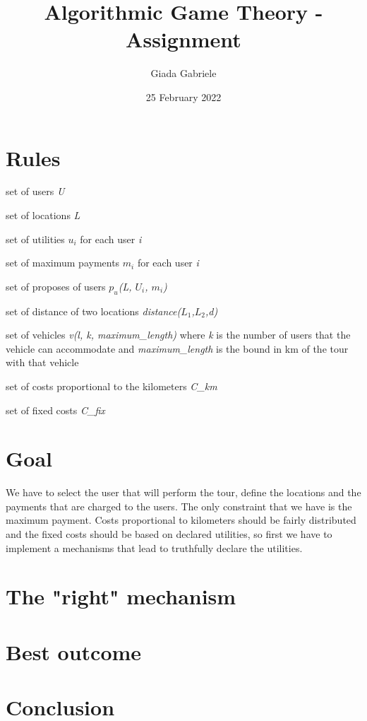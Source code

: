 \documentclass{article}
\title{Algorithmic Game Theory - Assignment}
\author{Giada Gabriele}
\date{25 February 2022}
\begin{document}
\maketitle
\section{Rules}
\begin{itemize}
\Large{
\item set of users \textit{U}
\item set of locations \textit{L}
\item set of utilities \textit{$u_i$} for each user \textit{i}
\item set of maximum payments \textit{$m_i$} for each user \textit{i}
\item set of proposes of users \textit{$p_u$(L, $U_i$, $m_i$)}
\item set of distance of two locations \textit{distance($L_1$,$L_2$,d)}
\item set of vehicles \textit{v(l, k, maximum\_length)} where \textit{k} is the number of users that the vehicle can accommodate and \textit{maximum\_length} is the bound in km of the tour with that vehicle   
}
\item set of costs proportional to the kilometers \textit{C\_km}
\item set of fixed costs \textit{C\_fix}
\end{itemize}
\section{Goal}
\Large{
We have to select the user that will perform the tour, define the locations and the payments that are charged to the users. The only constraint that we have is the maximum payment. Costs proportional to kilometers should be fairly distributed and the fixed costs should be based on declared utilities, so first we have to implement a mechanisms that lead to truthfully declare the utilities.
}
\section{The "right" mechanism}
\section{Best outcome}
\section{Conclusion}
\end{document}
